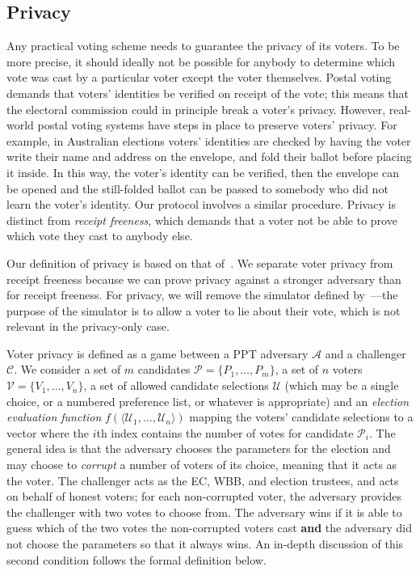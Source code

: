 \documentclass[12pt,a4paper]{article}
\theoremstyle{definition}
\newcounter{protocol}
\begin{document}
\subsection{Privacy}
Any practical voting scheme needs to guarantee the privacy of its voters. To be more precise, it should ideally not be possible for anybody to determine which vote was cast by a particular voter except the voter themselves. Postal voting demands that voters' identities be verified on receipt of the vote; this means that the electoral commission could in principle break a voter's privacy. However, real-world postal voting systems have steps in place to preserve voters' privacy. For example, in Australian elections voters' identities are checked by having the voter write their name and address on the envelope, and fold their ballot before placing it inside. In this way, the voter's identity can be verified, then the envelope can be opened and the still-folded ballot can be passed to somebody who did not learn the voter's identity. Our protocol involves a similar procedure. Privacy is distinct from \textit{receipt freeness}, which demands that a voter not be able to prove which vote they cast to anybody else.

Our definition of privacy is based on that of~\cite{kiayias2015end}. We separate voter privacy from receipt freeness because we can prove privacy against a stronger adversary than for receipt freeness. For privacy, we will remove the simulator defined by~\cite{kiayias2015end}---the purpose of the simulator is to allow a voter to lie about their vote, which is not relevant in the privacy-only case.

Voter privacy is defined as a game between a PPT adversary $\mathcal{A}$ and a challenger $\mathcal{C}$. We consider a set of $m$ candidates $\mathcal{P}=\{P_1,\ldots,P_m\}$, a set of $n$ voters $\mathcal{V}=\{V_1,\ldots,V_n\}$, a set of allowed candidate selections $\mathcal{U}$ (which may be a single choice, or a numbered preference list, or whatever is appropriate) and an \textit{election evaluation function} $f(\langle \mathcal{U}_1,\ldots,\mathcal{U}_n \rangle)$ mapping the voters' candidate selections to a vector where the $i$th index contains the number of votes for candidate $\mathcal{P}_i$. The general idea is that the adversary chooses the parameters for the election and may choose to \textit{corrupt} a number of voters of its choice, meaning that it acts as the voter. The challenger acts as the EC, WBB, and election trustees, and acts on behalf of honest voters; for each non-corrupted voter, the adversary provides the challenger with two votes to choose from. The adversary wins if it is able to guess which of the two votes the non-corrupted voters cast \textbf{and} the adversary did not choose the parameters so that it always wins. An in-depth discussion of this second condition follows the formal definition below.
\end{document}
